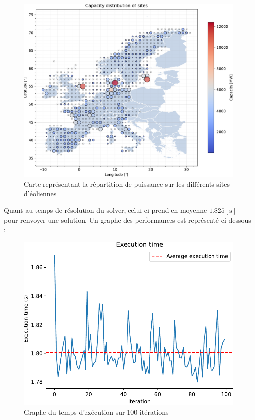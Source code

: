 \documentclass{article}
\newlength{\temp}
\begin{document}
\begin{figure}[h!]
    \centering
    \includegraphics[scale=0.5]{Images/Partie_1/Q1/capacity_distribution.pdf}
    \caption{Carte représentant la répartition de puissance sur les différents sites d'éoliennes}
    \label{fig:capacity_distribution_partie1}
\end{figure}

\newpage

Quant au temps de résolution du solver, celui-ci prend en moyenne $1.825 [\mathrm{s}]$ pour renvoyer une solution. Un graphe des performances est représenté ci-dessous :

\begin{figure}[h!]
    \centering
    \includegraphics[scale=0.5]{Images/Partie_1/Q1/execution_time.pdf}
    \caption{Graphe du temps d'exécution sur 100 itérations}
    \label{fig:execution_time_partie1}
\end{figure}
\end{document}
